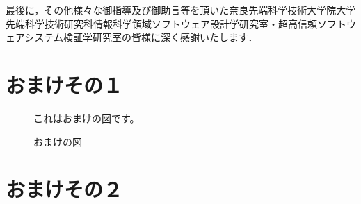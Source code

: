 \documentclass[12pt]{jarticle} %
\begin{document}
最後に，その他様々な御指導及び御助言等を頂いた奈良先端科学技術大学院大学先端科学技術研究科情報科学領域ソフトウェア設計学研究室・超高信頼ソフトウェアシステム検証学研究室の皆様に深く感謝いたします．


%
%
\newpage


%
%
\appendix

\section{おまけその１}
\label{omake1}



\begin{figure}
\centerline{これはおまけの図です。}
\caption{おまけの図}
\end{figure}


\section{おまけその２}
\end{document}
